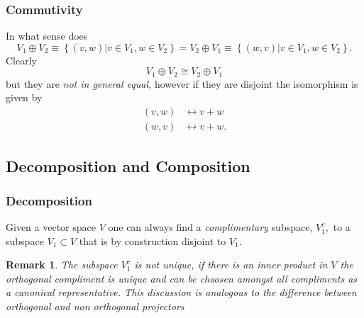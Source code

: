 \documentclass[aps,preprint]{revtex4}
\newtheorem{remark}[theorem]{Remark}
\begin{document}
\subsubsection{Commutivity}

In what sense does 
\begin{equation}
V_{1}\oplus V_{2}\equiv\left\{ \left. \left( v,w\right) \right\vert v\in
V_{1},w\in V_{2}\right\} =V_{2}\oplus V_{1}\equiv\left\{ \left. \left(
w,v\right) \right\vert v\in V_{1},w\in V_{2}\right\} .
\end{equation}
Clearly 
\begin{equation}
V_{1}\oplus V_{2}\cong V_{2}\oplus V_{1}
\end{equation}
but they are \emph{not in general equal,} however if they are disjoint the
isomorphism is given by 
\begin{align}
\left( v,w\right) & \leftrightarrow v+w \\
\left( w,v\right) & \leftrightarrow v+w.
\end{align}

\subsection{Decomposition and Composition}

\subsubsection{Decomposition}

Given a vector space $V$ one can always find a \emph{complimentary}
subspace, $V_{1}^{c},$ to a subspace $V_{1}\subset V$ that is by
construction disjoint to $V_{1}.$

\begin{remark}
The subspace $V_{1}^{c}$ is not unique, if there is an inner product in $V$
the orthogonal compliment is unique and can be choosen amongst all
compliments as a canonical representative. This discussion is analogous to
the difference between orthogonal and non orthogonal projectors
\end{remark}
\end{document}
